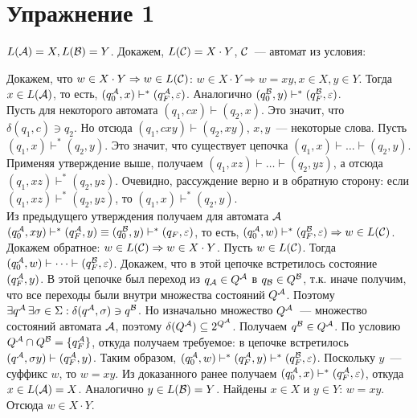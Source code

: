 \documentclass[a4paper]{article}
\def\A{{\cal A}}
\def\B{{\cal B}}
\def\C{{\cal C}}
\begin{document}
\section*{Упражнение 1}
$L(\A)=X,L(\B)=Y$. Докажем, $L(\C)=X\cdot Y$, $\C$~--- автомат из условия:
\begin{center}
\end{center}
Докажем, что $w\in X\cdot Y\Rightarrow w\in L(\C)$:\newline
$w\in X\cdot Y\Rightarrow w=xy, x\in X, y\in Y$. Тогда $x\in L(\A)$, то есть, $(q_0^\A,x)\vdash^*(q_F^\A,\varepsilon)$. Аналогично $(q_0^\B,y)\vdash^*(q_F^\B,\varepsilon)$.
\\[5pt]
Пусть для некоторого автомата $(q_1,cx)\vdash(q_2,x)$. Это значит, что $\delta(q_1,c)\ni q_2$. Но отсюда $(q_1,cxy)\vdash(q_2,xy)$, $x,y$~--- некоторые слова. Пусть $(q_1,x)\vdash^*(q_2,y)$. Это значит, что существует цепочка $(q_1,x)\vdash\dots\vdash(q_2,y)$. Применяя утверждение выше, получаем $(q_1,xz)\vdash\dots\vdash(q_2,yz)$, а отсюда $(q_1,xz)\vdash^*(q_2,yz)$. Очевидно, рассуждение верно и в обратную сторону: если $(q_1,xz)\vdash^*(q_2,yz)$, то $(q_1,x)\vdash^*(q_2,y)$.
\\[5pt]
Из предыдущего утверждения получаем для автомата $\A$ $(q_0^\A,xy)\vdash^*(q_F^\A,y)\equiv(q_0^\B,y)\vdash^*(q_F,\varepsilon)$, то есть, $(q_0^\A,w)\vdash^*(q_F^\B,\varepsilon)\Rightarrow w\in L(\C)$.\newline
Докажем обратное: $w\in L(\C)\Rightarrow w\in X\cdot Y$.\newline
Пусть $w\in L(\C)$. Тогда $(q_0^\A,w)\vdash\dots\vdash(q_F^\B,\varepsilon)$. Докажем, что в этой цепочке встретилось состояние $(q_F^\A,y)$.\newline
В этой цепочке был переход из $q_\A\in Q^\A$ в $q_\B\in Q^\B$, т.к. иначе получим, что все переходы были внутри множества состояний $Q^\A$. Поэтому $\exists q^\A\,\exists\sigma\in\Sigma:\delta(q^\A,\sigma)\ni q^\B$. Но изначально множество $Q^\A$~--- множество состояний автомата $\A$, поэтому $\delta(Q^\A)\subseteq 2^{Q^\A}$. Получаем $q^\B\in Q^\A$. По условию $Q^\A\cap Q^\B=\{q_F^\A\}$, откуда получаем требуемое: в цепочке встретилось $(q^\A,\sigma y)\vdash(q_F^\A,y)$.\newline
Таким образом, $(q_0^\A,w)\vdash^*(q_F^\A,y)\vdash^*(q_F^\B,\varepsilon)$. Поскольку $y$~--- суффикс $w$, то $w=xy$. Из доказанного ранее получаем $(q_0^\A,x)\vdash^*(q_F^\A,\varepsilon)$, откуда $x\in L(\A)=X$. Аналогично $y\in L(\B)=Y$. Найдены $x\in X$ и $y\in Y$: $w=xy$. Отсюда $w\in X\cdot Y$.
\end{document}
